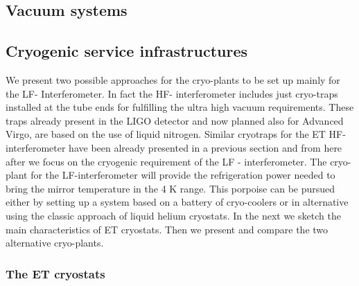 













%

\FloatBarrier
\subsection{Vacuum systems}

\label{WP1vac}
\FloatBarrier
\subsection{Cryogenic service infrastructures}
\label{cryo}
We present two possible approaches for the cryo-plants to be set up mainly for the LF- Interferometer.
In fact the HF- interferometer includes just cryo-traps installed at the tube ends for fulfilling  the ultra high vacuum requirements. These traps already present in the LIGO detector and now planned also for  Advanced Virgo,  are based on the use of liquid nitrogen. Similar cryotraps for the ET HF- interferometer have been already presented  in a previous section and from here after  we focus  on the cryogenic requirement of  the LF - interferometer.
The cryo-plant for the LF-interferometer  will provide  the refrigeration power needed to bring the mirror temperature  in the 4 K range. This porpoise can be pursued either by setting up a system based on a battery of cryo-coolers or in alternative using the classic approach of   liquid helium cryostats. In the next we sketch the main characteristics of  ET cryostats. Then we  present and compare the two alternative cryo-plants.


\subsubsection{The ET  cryostats}


